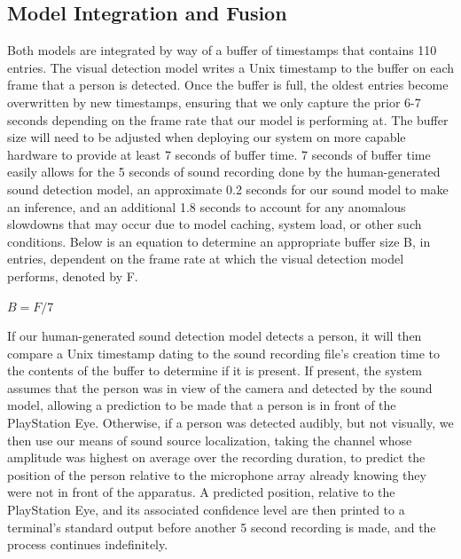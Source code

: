 \documentclass{article}
\begin{document}
\subsection{Model Integration and Fusion}
Both models are integrated by way of a buffer of timestamps that contains 110 entries. The visual detection model writes a Unix timestamp to the buffer on each frame that a person is detected. Once the buffer is full, the oldest entries become overwritten by new timestamps, ensuring that we only capture the prior 6-7 seconds depending on the frame rate that our model is performing at. The buffer size will need to be adjusted when deploying our system on more capable hardware to provide at least 7 seconds of buffer time. 7 seconds of buffer time easily allows for the 5 seconds of sound recording done by the human-generated sound detection model, an approximate 0.2 seconds for our sound model to make an inference, and an additional 1.8 seconds to account for any anomalous slowdowns that may occur due to model caching, system load, or other such conditions. Below is an equation to determine an appropriate buffer size B, in entries, dependent on the frame rate at which the visual detection model performs, denoted by F.

\begin{math}
B = F / 7
\end{math}

If our human-generated sound detection model detects a person, it will then compare a Unix timestamp dating to the sound recording file’s creation time to the contents of the buffer to determine if it is present. If present, the system assumes that the person was in view of the camera and detected by the sound model, allowing a prediction to be made that a person is in front of the PlayStation Eye. Otherwise, if a person was detected audibly, but not visually, we then use our means of sound source localization, taking the channel whose amplitude was highest on average over the recording duration, to predict the position of the person relative to the microphone array already knowing they were not in front of the apparatus. A predicted position, relative to the PlayStation Eye, and its associated confidence level are then printed to a terminal’s standard output before another 5 second recording is made, and the process continues indefinitely. 
\end{document}
